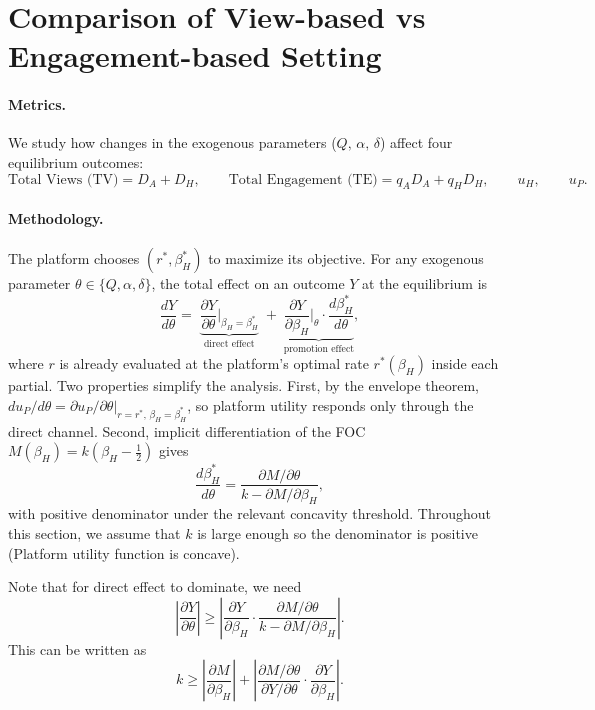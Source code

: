 \section{Comparison of View-based vs Engagement-based Setting}\label{sec:comparison}

\paragraph{Metrics.} We study how changes in the exogenous parameters
($Q,\,\alpha,\,\delta$) affect four equilibrium outcomes:
\[
\text{Total Views (TV)} = D_A + D_H, \qquad
\text{Total Engagement (TE)} = q_A D_A + q_H D_H,
\qquad u_H, \qquad u_P.
\]

\paragraph{Methodology.} The platform chooses $(r^*, \beta_H^*)$ to
maximize its objective. For any exogenous parameter
$\theta \in \{Q, \alpha, \delta\}$, the total effect on an outcome $Y$
at the equilibrium is
\begin{equation}\label{eq:decomp}
\frac{dY}{d\theta}
=\;\underbrace{\frac{\partial Y}{\partial \theta}\bigg|_{\beta_H = \beta_H^*}}_{\text{direct effect}}
\;+\;\underbrace{\frac{\partial Y}{\partial \beta_H}\bigg|_{\theta}\cdot\frac{d\beta_H^*}{d\theta}}_{\text{promotion effect}},
\end{equation}
where $r$ is already evaluated at the platform's optimal rate
$r^*(\beta_H)$ inside each partial. Two properties simplify the
analysis. First, by the envelope theorem,
$du_P/d\theta = \partial u_P/\partial\theta\big|_{r=r^*,\,\beta_H=\beta_H^*}$,
so platform utility responds only through the direct channel. Second,
implicit differentiation of the FOC
$M(\beta_H) = k(\beta_H - \tfrac12)$ gives
\begin{equation}\label{eq:implicit-beta}
\frac{d\beta_H^*}{d\theta}
=\frac{\partial M/\partial\theta}{k - \partial M/\partial\beta_H},
\end{equation}
with positive denominator under the relevant concavity threshold. Throughout this section, we assume that $k$ is large enough so the denominator is positive (Platform utility function is concave).

Note that for direct effect to dominate, we need
\[
\left| \frac{\partial Y}{\partial \theta} \right| \geq \left| \frac{\partial Y}{\partial \beta_H} \cdot \frac{\partial M/\partial\theta}{k - \partial M/\partial\beta_H} \right|.
\]
This can be written as 
\begin{equation}
\label{eq:general_k_threshold}
k \geq \left| \frac{\partial M}{\partial \beta_H} \right| + \left| \frac{\partial M/\partial \theta}{\partial Y/\partial \theta} \cdot \frac{\partial Y}{\partial \beta_H} \right|.
\end{equation}

